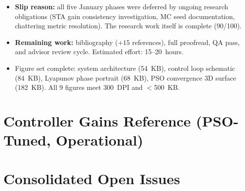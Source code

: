 \documentclass[10pt, a4paper]{article}
\begin{document}
\begin{itemize}[leftmargin=1.5em,itemsep=0.2em]
  \item \textbf{Slip reason:} all five January phases were deferred by ongoing
  research obligations (STA gain consistency investigation, MC seed documentation,
  chattering metric resolution).  The research work itself is complete (90/100).
  \item \textbf{Remaining work:} bibliography ($+15$ references), full proofread,
  QA pass, and advisor review cycle.  Estimated effort: 15--20~hours.
  \item Figure set complete: system architecture (54~KB), control loop schematic
  (84~KB), Lyapunov phase portrait (68~KB), PSO convergence 3D surface (182~KB).
  All 9 figures meet 300~DPI and $<$500~KB.
\end{itemize}

\appendix
\section{Controller Gains Reference (PSO-Tuned, Operational)}

\begin{center}
\end{center}

\section{Consolidated Open Issues}
\label{app:issues}
\end{document}
